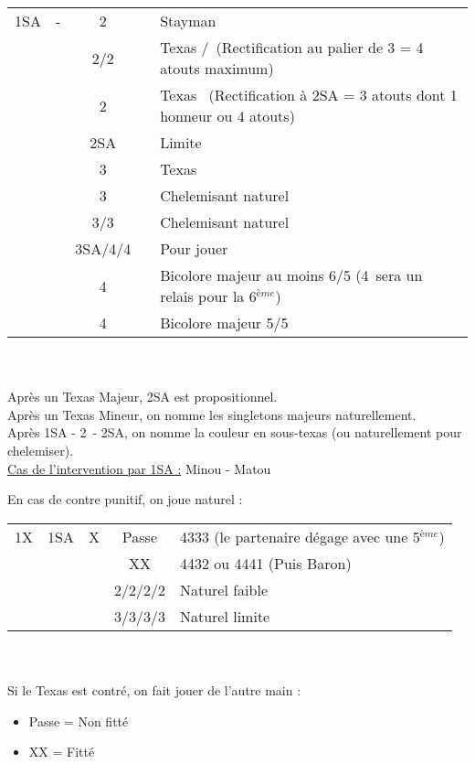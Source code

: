 \documentclass[a4paper, oneside, 11pt]{report}
\begin{document}
		\begin{tabular}{cccc|l}
		1SA & - & 2\trefle && Stayman\\
		&& 2\carreau/2\coeur && Texas \coeur/\pique\ (Rectification au palier de 3 = 4 atouts maximum)\\
		&& 2\pique && Texas \trefle\ (Rectification à 2SA = 3 atouts dont 1 honneur ou 4 atouts)\\
		&& 2SA && Limite\\
		&& 3\trefle && Texas \carreau\\
		&& 3\carreau && Chelemisant naturel\\
		&& 3\coeur/3\pique && Chelemisant naturel\\
		&& 3SA/4\coeur/4\pique && Pour jouer\\
		&& 4\trefle && Bicolore majeur au moins 6/5 (4\carreau\ sera un relais pour la 6$^{ème}$)\\
		&& 4\carreau && Bicolore majeur 5/5\\
		\end{tabular}\\\\

		Après un Texas Majeur,  2SA est propositionnel.\\
		Après un Texas Mineur,  on nomme les singletons majeurs naturellement.\\
		Après 1SA - 2\trefle\ - 2SA,  on nomme la couleur en sous-texas (ou naturellement pour chelemiser).\\

		\underline{Cas de l'intervention par 1SA :} Minou - Matou
	
		En cas de contre punitif, on joue naturel :\\
		\begin{tabular}{cccc|l}
		1X & 1SA & X & Passe & 4333 (le partenaire dégage avec une 5$^{ème}$)\\
		&&& XX & 4432 ou 4441 (Puis Baron)\\
		&&& 2\trefle/2\carreau/2\coeur/2\pique & Naturel faible\\
		&&& 3\trefle/3\carreau/3\coeur/3\pique & Naturel limite\\
		\end{tabular}\\\\

		Si le Texas est contré, on fait jouer de l'autre main :
		\begin{itemize}
		\item Passe = Non fitté
		\item XX = Fitté\\
		\end{itemize}
		
\end{document}
